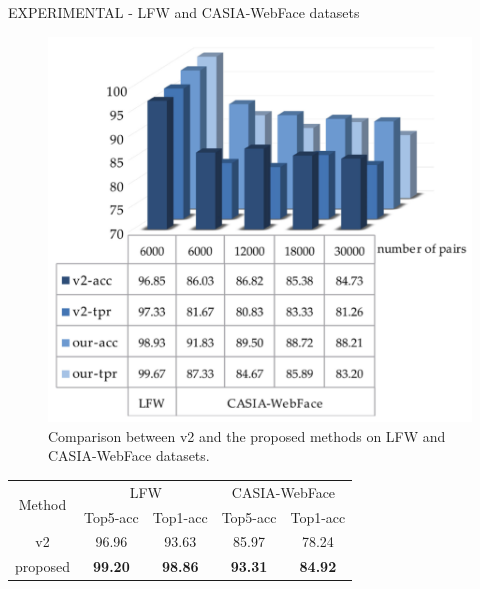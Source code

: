\begin{frame}{EXPERIMENTAL - LFW and CASIA-WebFace datasets}
    \begin{minipage}{\linewidth}
        \centering
        \begin{minipage}{0.45\linewidth}
            \begin{figure}[h!]
                \centering
                \includegraphics[width = \linewidth]{images/paper9/comparisonV2.png}
                \centering
                \caption{Comparison between v2 and the proposed methods on LFW and CASIA-WebFace datasets.}
                \label{fig:compareV2}
            \end{figure}
            \begin{table}[h!]
                \centering
                \begin{adjustbox}{max width=\textwidth}
                \begin{tabular}{|c|cc|cc|}
                    \hline
                    \multirow{2}{*}{Method} & \multicolumn{2}{c|}{LFW} & \multicolumn{2}{c|}{CASIA-WebFace}\\
                    & Top5-acc & Top1-acc & Top5-acc & Top1-acc\\
                    \hline
                    v2 & 96.96 & 93.63 & 85.97 & 78.24\\
                    \hline
                    proposed & \bfseries{99.20} & \bfseries{98.86} & \bfseries{93.31} & \bfseries{84.92}\\

\end{tabular}
\end{adjustbox}
\end{table}
\end{minipage}
\end{minipage}
\end{frame}
